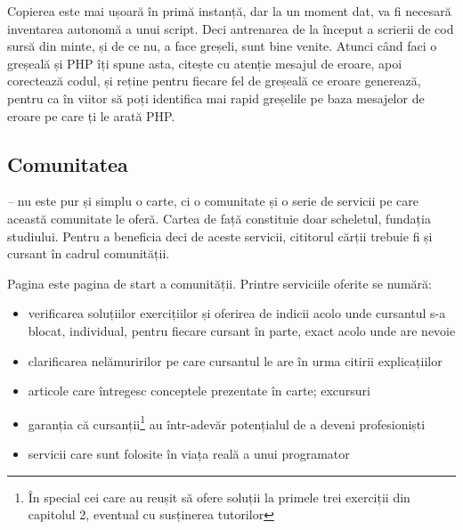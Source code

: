 Copierea este mai ușoară în primă instanță, dar la un moment dat, va fi necesară
inventarea autonomă a unui script. Deci antrenarea de la început a scrierii de
cod sursă din minte, și de ce nu, a face greșeli, sunt bine venite. Atunci când
faci o greșeală și PHP îți spune asta, citește cu atenție mesajul de eroare,
apoi corectează codul, și reține pentru fiecare fel de greșeală ce eroare
generează, pentru ca în viitor să poți identifica mai rapid greșelile pe baza
mesajelor de eroare pe care ți le arată PHP.


\subsection*{Comunitatea}
{}

\textit{{\thetitle} -- {\thesubtitle}} nu este pur și simplu o carte, ci
o comunitate și o serie de servicii pe care această comunitate le oferă. Cartea
de față constituie doar scheletul, fundația studiului. Pentru a beneficia deci
de aceste servicii, cititorul cărții trebuie fi și cursant în cadrul
comunității.

Pagina {\phpro} este pagina de start a comunității. Printre serviciile oferite
se numără:

\begin{itemize}

    \item verificarea soluțiilor exercițiilor și oferirea de indicii acolo unde
        cursantul s-a blocat, individual, pentru fiecare cursant în parte, exact
        acolo unde are nevoie

    \item clarificarea nelămuririlor pe care cursantul le are în urma citirii
        explicațiilor

    \item articole care întregesc conceptele prezentate în carte; excursuri

    \item garanția că cursanții\footnote{În special cei care au reușit să ofere
        soluții la primele trei exerciții din capitolul 2, eventual cu
    susținerea tutorilor} au într-adevăr potențialul de a deveni profesioniști

    \item servicii care sunt folosite în viața reală a unui programator

\end{itemize}

